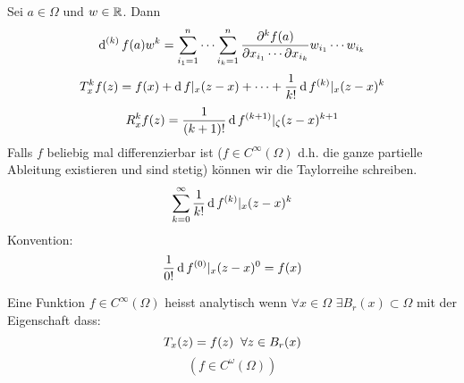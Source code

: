 Sei $a\in\Omega$ und $w\in\mathbb{R}$. Dann
\[\operatorname{d}^{(k)}f(a)w^k=\sum^n_{i_1=1}\cdots\sum^n_{i_k=1}\frac{\partial^kf(a)}{\partial x_{i_1}\cdots\partial x_{i_k}}w_{i_1}\cdots w_{i_k}\]
\[T^k_xf(z)=f(x)+\operatorname{d} f|_x(z-x)+\cdots+\frac{1}{k!}\operatorname{d} f^{(k)}|_x(z-x)^k\]
\[R^k_xf(z)=\frac{1}{(k+1)!}\operatorname{d} f^{(k+1)}|_\zeta (z-x)^{k+1}\]
Falls $f$ beliebig mal differenzierbar ist ($f\in C^{\infty}(\Omega)$ d.h. die ganze partielle Ableitung existieren und sind stetig) können wir die Taylorreihe schreiben.
\[\sum_{k=0}^\infty\frac{1}{k!}\operatorname{d} f^{(k)}|_x(z-x)^k\]
Konvention:
\[\frac{1}{0!}\operatorname{d} f^{(0)}|_x(z-x)^0=f(x)\]
\begin{Def}
  Eine Funktion $f\in C^\infty(\Omega)$ heisst analytisch wenn $\forall x\in \Omega$ $\exists B_r(x)\subset\Omega$ mit der Eigenschaft dass:
  \[T_x(z)=f(z)\hspace{2mm}\forall z\in B_r(x)\]
  \[(f\in C^\omega (\Omega))\]
\end{Def}
